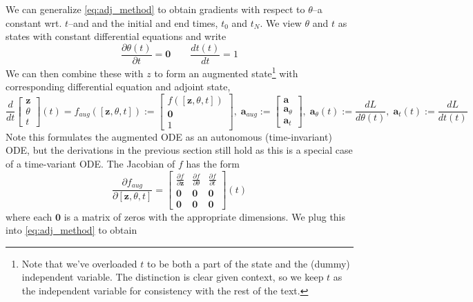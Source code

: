 \documentclass{article}
\newcommand{\va}{\mathbf{a}}
\newcommand{\vz}{\mathbf{z}}
\newcommand{\sol}{\vz}  %
\newcommand{\adj}{\va}
\begin{document}
\begin{appendices}
We can generalize \eqref{eq:adj_method} to obtain gradients with respect to $\theta$--a constant wrt. $t$--and and the initial and end times, $t_0$ and $t_N$. We view $\theta$ and $t$ as states with constant differential equations and write
\begin{equation}
\frac{\partial \theta(t)}{\partial t} = \mathbf{0} \quad\quad \frac{dt(t)}{dt} = 1
\end{equation}
We can then combine these with $z$ to form an augmented state\footnote{Note that we've overloaded $t$ to be both a part of the state and the (dummy) independent variable. The distinction is clear given context, so we keep $t$ as the independent variable for consistency with the rest of the text.} with corresponding differential equation and adjoint state,
\begin{equation}
\frac{d}{dt} \begin{bmatrix} 
\sol \\ \theta \\ t
\end{bmatrix}(t) = f_{aug}([\sol, \theta, t]) := \begin{bmatrix}
f([\sol, \theta, t]) \\ \mathbf{0} \\ 1
\end{bmatrix}, \;
\adj_{aug} := \begin{bmatrix}
\adj \\ \adj_\theta \\ \adj_t
\end{bmatrix}, \;
\adj_\theta(t) := \frac{dL}{d\theta(t)},\;
\adj_t(t) := \frac{dL}{dt(t)}
\end{equation}
Note this formulates the augmented ODE as an autonomous (time-invariant) ODE, but the derivations in the previous section still hold as this is a special case of a time-variant ODE. The Jacobian of $f$ has the form
\begin{equation}
\frac{\partial f_{aug}}{\partial [\sol, \theta, t]} = \begin{bmatrix}
\frac{\partial f }{\partial \sol } & \frac{\partial f }{\partial \theta } & \frac{\partial f }{\partial t} \\
\mathbf{0} & \mathbf{0} & \mathbf{0} \\
\mathbf{0} & \mathbf{0} & \mathbf{0}
\end{bmatrix}(t)
\end{equation}
where each $\mathbf{0}$ is a matrix of zeros with the appropriate dimensions.
We plug this into \eqref{eq:adj_method} to obtain
\begin{equation}

\end{equation}
\end{appendices}
\end{document}
